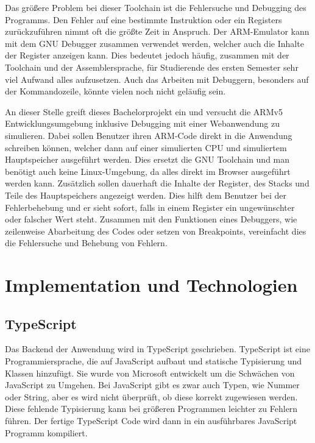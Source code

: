 \documentclass[a4paper, 11pt, onecolumn]{article}
\begin{document}
Das größere Problem bei dieser Toolchain ist die Fehlersuche und Debugging des Programms. Den Fehler auf eine bestimmte Instruktion oder ein Registers zurückzuführen nimmt oft die größte Zeit in Anspruch. Der ARM-Emulator kann mit dem GNU Debugger \cite{gdb} zusammen verwendet werden, welcher auch die Inhalte der Register anzeigen kann. Dies bedeutet jedoch häufig, zusammen mit der Toolchain und der Assemblersprache, für Studierende des ersten Semester sehr viel Aufwand alles aufzusetzen. Auch das Arbeiten mit Debuggern, besonders auf der Kommandozeile, könnte vielen noch nicht geläufig sein. 

An dieser Stelle greift dieses Bachelorprojekt ein und versucht die ARMv5 Entwicklungsumgebung inklusive Debugging mit einer Webanwendung zu simulieren. Dabei sollen Benutzer ihren ARM-Code direkt in die Anwendung schreiben können, welcher dann auf einer simulierten CPU und simuliertem Hauptspeicher ausgeführt werden. Dies ersetzt die GNU Toolchain und man benötigt auch keine Linux-Umgebung, da alles direkt im Browser ausgeführt werden kann. Zusätzlich sollen dauerhaft die Inhalte der Register, des Stacks und Teile des Hauptspeichers angezeigt werden. Dies hilft dem Benutzer bei der Fehlerbehebung und er sieht sofort, falls in einem Register ein ungewünschter oder falscher Wert steht. Zusammen mit den Funktionen eines Debuggers, wie zeilenweise Abarbeitung des Codes oder setzen von Breakpoints, vereinfacht dies die Fehlersuche und Behebung von Fehlern.

\section{Implementation und Technologien}

\subsection{TypeScript}\label{sec:type}

Das Backend der Anwendung wird in TypeScript geschrieben. TypeScript \cite{typescript} ist eine Programmiersprache, die auf JavaScript aufbaut und statische Typisierung und Klassen hinzufügt. Sie wurde von Microsoft entwickelt um die Schwächen von JavaScript zu Umgehen. Bei JavaScript gibt es zwar auch Typen, wie Nummer oder String, aber es wird nicht überprüft, ob diese korrekt zugewiesen werden. Diese fehlende Typisierung kann bei größeren Programmen leichter zu Fehlern führen. Der fertige TypeScript Code wird dann in ein ausführbares JavaScript Programm kompiliert.
\end{document}
